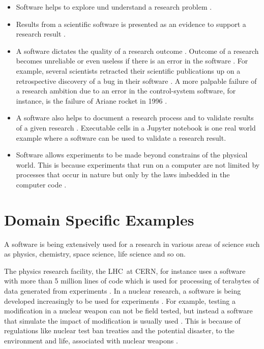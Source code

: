 \begin{itemize}%

	\item Software helps to explore und understand a research problem \citep{hannay2009scientists}.
	\item Results from a scientific software is presented as an evidence to support a research result \citep{kanewala2014testing}. 
	\item A software dictates the quality of a research outcome \citep{hannay2009scientists}. Outcome of a research becomes unreliable or even useless if there is an error in the software \citep{soergel2014rampant}. For example, several scientists retracted their scientific publications up on a retrospective discovery of a bug in their software \citep{wilson2014best, merali2010computational, miller2006scientist}. A more palpable failure of a research ambition due to an error in the control-system software, for instance, is the failure of Ariane rocket in 1996 \citep{enwiki:1054482061}.  
	\item A software also helps to document a research process and to validate results of a given research \citep{jay2020software}. Executable cells in a Jupyter notebook is one real world example where a software can be used to validate a research result.
	\item Software allows experiments to be made beyond constrains of the physical world. This is because experiments that run on a computer are not limited by processes that occur in nature but only by the laws imbedded in the computer code \citep{wolfram1984computer}. 

\end{itemize}

\section{Domain Specific Examples}
\label{subsec:background:first_section:second_subsection}
A software is being extensively used for a research in various areas of science such as physics, chemistry, space science, life science and so on.

The physics research facility, the \ac{LHC}\ at \ac{CERN}, for instance uses a software with more than 5 million lines of code which is used for processing of terabytes of data generated from experiments \citep{storer2017bridging}.
In a nuclear research, a software is being developed increasingly to be used for experiments \citep{yan2017case}. For example, testing a modification in a nuclear weapon can not be field tested, but instead a software that simulate the impact of modification is usually used \citep{kanewala2014testing}. This is because of regulations like nuclear test ban treaties and the potential disaster, to the environment and life, associated with nuclear weapons \citep{enwiki:1053274189}. 

